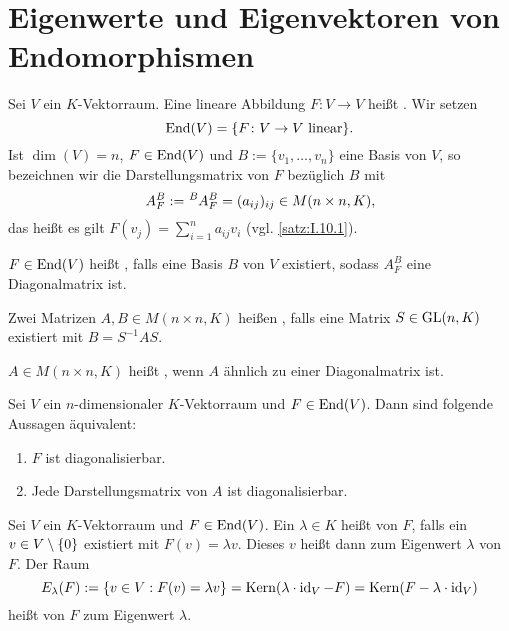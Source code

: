 \section{Eigenwerte und Eigenvektoren von Endomorphismen}

\setcounter{definition}{1}
\begin{definition}
	\label{def:I.16.2}
	Sei $V$ ein $K$-Vektorraum.
	Eine lineare Abbildung $F \colon V \rightarrow V$ heißt .
	Wir setzen
	\[
		\operatorname{End}(V) = \{F \colon V \rightarrow V \text{ linear}\}.
	\]
	Ist $\dim(V) = n$, $F \in \operatorname{End}(V)$ und $B := \{v_1,\dots,v_n\}$ eine Basis von $V$, so bezeichnen wir die Darstellungsmatrix von $F$ bezüglich $B$ mit
	\[
		\mat{A}{}{B}{F} := \mat{A}{B}{B}{F} = (a_{ij})_{ij} \in M(n \times n,K),
	\]
	das heißt es gilt $F(v_j) = \sum\limits_{i=1}^{n} a_{ij}v_i$ (vgl. \autoref{satz:I.10.1}).
	
	$F \in \operatorname{End}(V)$ heißt , falls eine Basis $B$ von $V$ existiert, sodass $A^B_F$ eine Diagonalmatrix ist.
\end{definition}
\newpage
\begin{definition}
	\label{def:I.16.3}
	Zwei Matrizen $A,B \in M(n \times n,K)$ heißen , falls eine Matrix $S \in \operatorname{GL}(n,K)$ existiert mit $B = S^{-1}AS$.
	
	$A \in M(n\times n,K)$ heißt , wenn $A$ ähnlich zu einer Diagonalmatrix ist.
\end{definition}

\begin{satz}
	\label{satz:I.16.4}
	Sei $V$ ein $n$-dimensionaler $K$-Vektorraum und $F \in \operatorname{End}(V)$.
	Dann sind folgende Aussagen äquivalent:
	\begin{enumerate}[(1)]
		\item $F$ ist diagonalisierbar.
		\item Jede Darstellungsmatrix von $A$ ist diagonalisierbar.
	\end{enumerate}
\end{satz}

\setcounter{definition}{6}
\begin{definition}
	\label{def:I.16.7}
	Sei $V$ ein $K$-Vektorraum und $F \in \operatorname{End}(V)$.
	Ein $\lambda \in K$ heißt  von $F$, falls ein $v \in V \setminus \{0\}$ existiert mit $F(v) = \lambda v$.
	Dieses $v$ heißt dann  zum Eigenwert $\lambda$ von $F$.
	Der Raum
	\[
		E_\lambda(F) := \{v \in V : F(v) = \lambda v\} = \operatorname{Kern}(\lambda \cdot \operatorname{id}_V - F) = \operatorname{Kern}(F - \lambda \cdot \operatorname{id}_V)
	\]
	heißt  von $F$ zum Eigenwert $\lambda$.
\end{definition}

